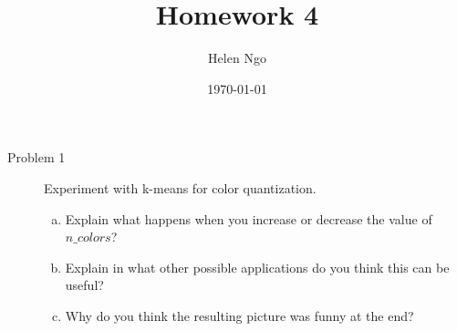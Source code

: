 \documentclass[a4paper]{article}
\title{Homework 4}
\author{Helen Ngo}
\date{\today}
\begin{document}
\lstset{language=Python,basicstyle=\ttfamily\footnotesize}

\maketitle

\begin {description}

\item[Problem 1] Experiment with k-means for color quantization.

\begin{enumerate}[(e) i.]
\item Explain what happens when you increase or decrease the value of $n\_colors$?
\item Explain in what other possible applications do you think this can be useful?
\item Why do you think the resulting picture was funny at the end?
\end{enumerate}


\end{description}
\end{document}
